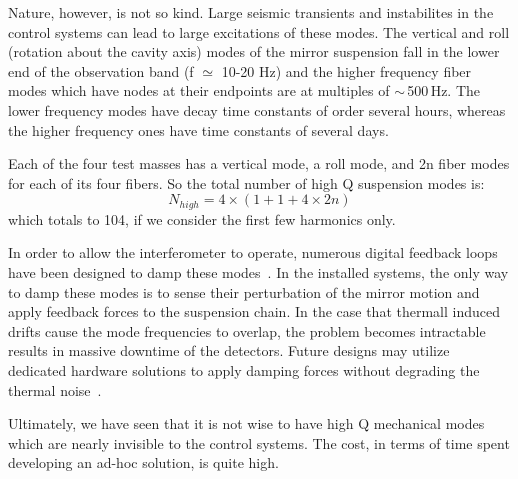 Nature, however, is not so kind. Large seismic transients and instabilites in the control systems can lead to large excitations of these modes. The vertical and roll (rotation about the cavity axis)
modes of the mirror suspension fall in the lower end of the observation band
(f $\simeq$ 10-20 Hz) and the higher frequency fiber modes which have nodes at
their endpoints are at multiples of $\sim$\,500\,Hz. The lower frequency modes have
decay time constants of order several hours, whereas the higher frequency ones
have time constants of several days.

Each of the four test masses has a vertical mode, a roll mode, and 2n fiber modes
for each of its four fibers. So the total number of high Q suspension modes is:
\begin{equation}
N_{high} = 4 \times (1 + 1 + 4 \times 2n)
\end{equation}
which totals to 104, if we consider the first few harmonics only.

In order to allow the interferometer to operate, numerous digital feedback
loops have been designed to damp these modes~\cite{martynov2015lock}. In the
installed systems, the only way to damp these modes is to sense their perturbation
of the mirror motion and apply feedback forces to the suspension chain. In the case
that thermall induced drifts cause the mode frequencies to overlap, the problem
becomes intractable results in massive downtime of the detectors. Future designs
may utilize dedicated hardware solutions to apply damping forces without degrading
the thermal noise~\cite{Dmitriev:2010hk, Lockerbie:2011zma}.

Ultimately, we have seen that it is not wise to have high Q mechanical modes which are nearly invisible to the control systems. The cost, in terms of time spent developing an ad-hoc solution, is quite high.



